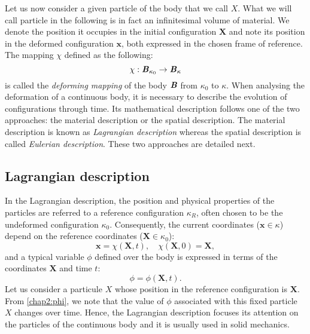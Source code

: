 Let us now consider a given particle of the body that we call $X$. What we will call particle in the following is in fact an infinitesimal volume of material. We denote the position it occupies in the initial configuration $\mathbf{X}$ and note its position in the deformed configuration $\mathbf{x}$, both expressed in the chosen frame of reference. The mapping $\chi$ defined as the following:
\begin{equation}
\label{chap2:mapping}
\chi : \textbf{\textit{B}}_{\kappa_{0}} \rightarrow \textbf{\textit{B}}_{\kappa}
\end{equation} 
is called the \emph{deforming mapping} of the body $\textbf{\textit{B}}$ from $\kappa_{0}$ to $\kappa$. When analysing the deformation of a continuous body, it is necessary to describe the evolution of configurations through time. Its mathematical description follows one of the two approaches: the material description or the spatial description. The material description is known as \emph{Lagrangian description} whereas the spatial description is called \emph{Eulerian description}. These two approaches are detailed next. 

	\subsection{Lagrangian description}	
In the Lagrangian description, the position and physical properties of the particles are referred to a reference configuration $\kappa_{R}$, often chosen to be the undeformed configuration $\kappa_{0}$. \ON Consequently, the current coordinates ($\mathbf{x} \in \kappa$) depend on the reference coordinates ($\mathbf{X} \in \kappa_{0}$): \OFF
\begin{equation}
\textbf{x} = \chi(\textbf{X}, t), \quad \chi(\textbf{X}, 0) = \textbf{X},
\end{equation}
\ON and a typical variable $\phi$ defined over the body is expressed in terms of the coordinates $\mathbf{X}$ and time $t$: \OFF
\begin{equation}
\label{chap2:phi}
\phi = \phi(\textbf{X}, t).
\end{equation}
\ON Let us consider a particule $X$ whose position in the reference configuration is $\mathbf{X}$. From \eqref{chap2:phi}, we note that the value of $\phi$ associated with this fixed particle $X$ changes over time. Hence, \OFF the Lagrangian description focuses its attention on the particles of the continuous body and it is usually used in solid mechanics.
	
